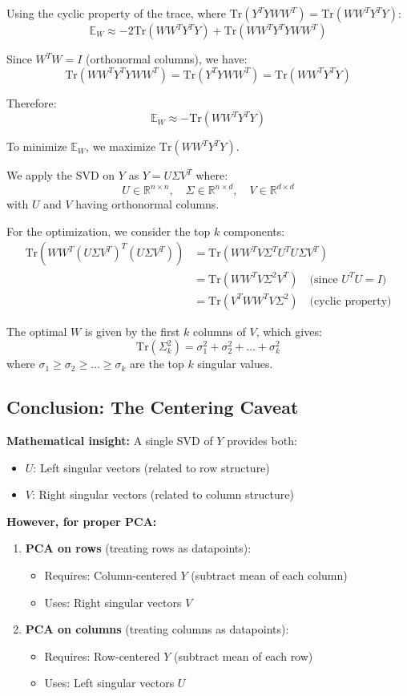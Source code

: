 \documentclass[a4paper]{scrartcl}
\begin{document}
Using the cyclic property of the trace, where $\text{Tr}(Y^TYWW^T) = \text{Tr}(WW^TY^TY)$:
\[
  \mathbb{E}_W \approx - 2\text{Tr}(WW^TY^TY) + \text{Tr}(WW^TY^TYWW^T)
\]

Since $W^TW = I$ (orthonormal columns), we have:
\[
\text{Tr}(WW^TY^TYWW^T) = \text{Tr}(Y^TYWW^T) = \text{Tr}(WW^TY^TY)
\]

Therefore:
\[
  \mathbb{E}_W \approx -\text{Tr}(WW^TY^TY)
\]

To minimize $\mathbb{E}_W$, we maximize $\text{Tr}(WW^TY^TY)$.

We apply the SVD on $Y$ as $Y = U\Sigma V^T$ where:
\[
U \in \mathbb{R}^{n \times n}, \quad \Sigma \in \mathbb{R}^{n \times d}, \quad V \in \mathbb{R}^{d \times d}
\]
with $U$ and $V$ having orthonormal columns.

For the optimization, we consider the top $k$ components:
\begin{align*}
\text{Tr}\left(WW^T(U\Sigma V^T)^T(U\Sigma V^T)\right) &= \text{Tr}\left(WW^TV\Sigma^T U^TU\Sigma V^T\right)\\
&= \text{Tr}\left(WW^TV\Sigma^2V^T\right) \quad \text{(since } U^TU = I\text{)}\\
&= \text{Tr}\left(V^TWW^TV\Sigma^2\right) \quad \text{(cyclic property)}
\end{align*}

The optimal $W$ is given by the first $k$ columns of $V$, which gives:
\[
\text{Tr}(\Sigma_k^2) = \sigma_1^2 + \sigma_2^2 + \ldots + \sigma_k^2
\]
where $\sigma_1 \geq \sigma_2 \geq \ldots \geq \sigma_k$ are the top $k$ singular values.

\subsection*{Conclusion: The Centering Caveat}

\textbf{Mathematical insight:} A single SVD of $Y$ provides both:
\begin{itemize}
\item $U$: Left singular vectors (related to row structure)
\item $V$: Right singular vectors (related to column structure)
\end{itemize}

\textbf{However, for proper PCA:}

\begin{enumerate}
\item \textbf{PCA on rows} (treating rows as datapoints):
\begin{itemize}
\item Requires: Column-centered $Y$ (subtract mean of each column)
\item Uses: Right singular vectors $V$
\end{itemize}

\item \textbf{PCA on columns} (treating columns as datapoints):
\begin{itemize}
\item Requires: Row-centered $Y$ (subtract mean of each row)  
\item Uses: Left singular vectors $U$
\end{itemize}
\end{enumerate}
\end{document}
